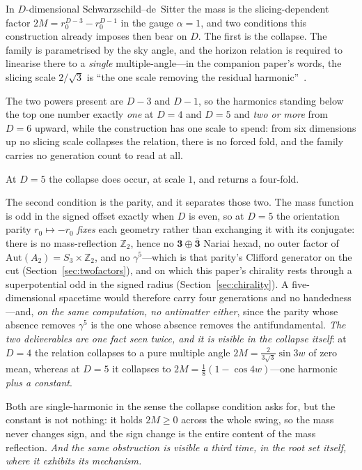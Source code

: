 \documentclass[11pt]{article}
\begin{document}
In $D$-dimensional Schwarzschild--de~Sitter the mass is the slicing-dependent factor $2M=r_{0}^{D-3}-r_{0}^{D-1}$ in the gauge $\alpha=1$, and two conditions this construction already imposes then bear on $D$. The first is the collapse. The family is parametrised by the sky angle, and the horizon relation is required to linearise there to a \emph{single} multiple-angle---in the companion paper's words, the slicing scale $2/\sqrt3$ is ``the one scale removing the residual harmonic''~\cite{JanzenSlicing}. 

The two powers present are $D-3$ and $D-1$, so the harmonics standing below the top one number exactly \emph{one} at $D=4$ and $D=5$ and \emph{two or more} from $D=6$ upward, while the construction has one scale to spend: from six dimensions up no slicing scale collapses the relation, there is no forced fold, and the family carries no generation count to read at all. 

At $D=5$ the collapse does occur, at scale $1$, and returns a four-fold. 

The second condition is the parity, and it separates those two. The mass function is odd in the signed offset exactly when $D$ is even, so at $D=5$ the orientation parity $r_{0}\mapsto-r_{0}$ \emph{fixes} each geometry rather than exchanging it with its conjugate: there is no mass-reflection $\mathbb{Z}_{2}$, hence no $\mathbf 3\oplus\bar{\mathbf 3}$ Nariai hexad, no outer factor of $\mathrm{Aut}(A_{2})=S_{3}\times\mathbb{Z}_{2}$, and no $\gamma^{5}$---which is that parity's Clifford generator on the cut (Section~\ref{sec:twofactors}), and on which this paper's chirality rests through a superpotential odd in the signed radius (Section~\ref{sec:chirality}). A five-dimensional spacetime would therefore carry four generations and no handedness---and, \emph{on the same computation, no antimatter either}, since the parity whose absence removes $\gamma^{5}$ is the one whose absence removes the antifundamental. \emph{The two deliverables are one fact seen twice, and it is visible in the collapse itself}: at $D=4$ the relation collapses to a pure multiple angle $2M=\tfrac{2}{3\sqrt3}\sin 3w$ of zero mean, whereas at $D=5$ it collapses to $2M=\tfrac18(1-\cos 4w)$---one harmonic \emph{plus a constant}.

Both are single-harmonic in the sense the collapse condition asks for, but the constant is not nothing: it holds $2M\ge0$ across the whole swing, so the mass never changes sign, and the sign change is the entire content of the mass reflection. \emph{And the same obstruction is visible a third time, in the root set itself, where it exhibits its mechanism.} 
\end{document}

